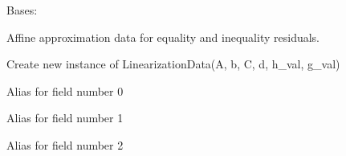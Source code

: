 \documentclass[letterpaper,10pt,english,openany,oneside]{sphinxmanual}
\begin{document}
\begin{fulllineitems}

\pysigstartsignatures
{}
\pysigstopsignatures
\sphinxAtStartPar
Bases: 

\sphinxAtStartPar
Affine approximation data for equality and inequality residuals.

\sphinxAtStartPar
Create new instance of LinearizationData(A, b, C, d, h\_val, g\_val)


\begin{fulllineitems}

\pysigstartsignatures
{}
\pysigstopsignatures
\sphinxAtStartPar
Alias for field number 0

\end{fulllineitems}



\begin{fulllineitems}

\pysigstartsignatures
{}
\pysigstopsignatures
\sphinxAtStartPar
Alias for field number 1

\end{fulllineitems}



\begin{fulllineitems}

\pysigstartsignatures
{}
\pysigstopsignatures
\sphinxAtStartPar
Alias for field number 2

\end{fulllineitems}




\end{fulllineitems}
\end{document}
